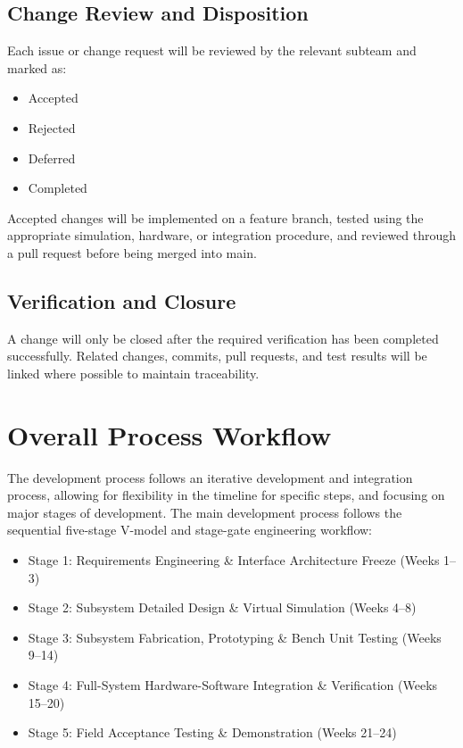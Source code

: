 \documentclass{article}
\begin{document}
\subsection{Change Review and Disposition}
Each issue or change request will be reviewed by the relevant subteam and marked as:
\begin{itemize}
	\item Accepted
	\item Rejected
	\item Deferred
	\item Completed
\end{itemize}
Accepted changes will be implemented on a feature branch, tested using the appropriate simulation, hardware, or integration procedure, and reviewed through a pull request before being merged into main.

\subsection{Verification and Closure}
A change will only be closed after the required verification has been completed successfully. Related changes, commits, pull requests, and test results will be linked where possible to maintain traceability.

\section{Overall Process Workflow}
The development process follows an iterative development and integration process, allowing for flexibility in the timeline for specific steps, and focusing on major stages of development. The main development process follows the sequential five-stage V-model and stage-gate engineering workflow: 
\begin{itemize}
	\item Stage 1: Requirements Engineering \& Interface Architecture Freeze (Weeks 1–3) 
	\item Stage 2: Subsystem Detailed Design \& Virtual Simulation (Weeks 4–8) 
	\item Stage 3: Subsystem Fabrication, Prototyping \& Bench Unit Testing (Weeks 9–14) 
	\item Stage 4: Full-System Hardware-Software Integration \& Verification (Weeks 15–20) 
	\item Stage 5: Field Acceptance Testing \& Demonstration (Weeks 21–24)
\end{itemize}
\end{document}

